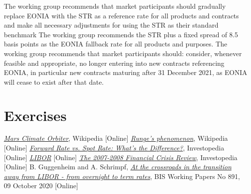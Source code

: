 The working group recommends that market participants should gradually replace EONIA with the STR as a reference rate for all products and contracts and make all necessary adjustments for using the STR as their standard benchmark The working group recommends the STR plus a fixed spread of 8.5
basis points as the EONIA fallback rate for all products and purposes. The working group recommends that market participants should: consider, whenever feasible and appropriate, no longer entering into new contracts referencing EONIA, in particular new contracts maturing after 31 December 2021, as EONIA will cease to exist after that date.


\section{Exercises}


\begin{thebibliography}{9}
	\href{https://en.wikipedia.org/wiki/Mars_Climate_Orbiter}{\emph{Mars Climate Orbiter}}, Wikipedia [Online]
	 \href{https://en.wikipedia.org/wiki/Runge\%27s_phenomenon}{\emph{Runge's phenomenon}}, Wikipedia [Online]
	\href{https://www.investopedia.com/ask/answers/042315/what-difference-between-forward-rate-and-spot-rate.asp}{\emph{Forward Rate vs. Spot Rate: What's the Difference?}}, Investopedia [Online]
	 \href{https://www.ig.com/it/glossario-trading/definizione-di-libor}{\emph{LIBOR}} [Online]
	 \href{https://www.investopedia.com/articles/economics/09/financial-crisis-review.asp}{\emph{The 2007-2008 Financial Crisis Review}}, Investopedia [Online]
	B. Guggenheim and A. Schrimpf, 
	\href{https://www.bis.org/publ/work891.htm}{\emph{At the crossroads in the transition away from LIBOR - from overnight to term rates}}, BIS Working Papers No 891, 09 October 2020 [Online]
\end{thebibliography}
